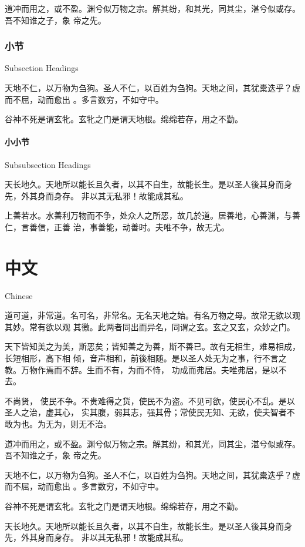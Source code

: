 \documentclass[a4paper, twoside, openany, extrafontsizes]{dlutthesis}
\begin{document}
道冲而用之，或不盈。渊兮似万物之宗。解其纷，和其光，同其尘，湛兮似或存。吾不知谁之子，象
帝之先。

\subsection{小节}{Subsection Headings}
\label{sub:subsection}

天地不仁，以万物为刍狗。圣人不仁，以百姓为刍狗。天地之间，其犹橐迭乎？虚而不屈，动而愈出
。多言数穷，不如守中。

谷神不死是谓玄牝。玄牝之门是谓天地根。绵绵若存，用之不勤。

\subsubsection{小小节}{Subsubsection Headings}
\label{subs:subsubsection}

天长地久。天地所以能长且久者，以其不自生，故能长生。是以圣人後其身而身先，外其身而身存。
非以其无私邪！故能成其私。

上善若水。水善利万物而不争，处众人之所恶，故几於道。居善地，心善渊，与善仁，言善信，正善
治，事善能，动善时。夫唯不争，故无尤。


\chapter{中文}{Chinese} %


道可道，非常道。名可名，非常名。无名天地之始。有名万物之母。故常无欲以观其妙。常有欲以观
其徼。此两者同出而异名，同谓之玄。玄之又玄，众妙之门。

天下皆知美之为美，斯恶矣；皆知善之为善，斯不善已。故有无相生，难易相成，长短相形，高下相
倾，音声相和，前後相随。是以圣人处无为之事，行不言之教。万物作焉而不辞。生而不有，为而不恃，
功成而弗居。夫唯弗居，是以不去。

不尚贤， 使民不争。不贵难得之货，使民不为盗。不见可欲，使民心不乱。是以圣人之治，虚其心，
实其腹，弱其志，强其骨；常使民无知、无欲，使夫智者不敢为也。为无为，则无不治。

道冲而用之，或不盈。渊兮似万物之宗。解其纷，和其光，同其尘，湛兮似或存。吾不知谁之子，象
帝之先。

天地不仁，以万物为刍狗。圣人不仁，以百姓为刍狗。天地之间，其犹橐迭乎？虚而不屈，动而愈出
。多言数穷，不如守中。

谷神不死是谓玄牝。玄牝之门是谓天地根。绵绵若存，用之不勤。

天长地久。天地所以能长且久者，以其不自生，故能长生。是以圣人後其身而身先，外其身而身存。
非以其无私邪！故能成其私。
\end{document}
